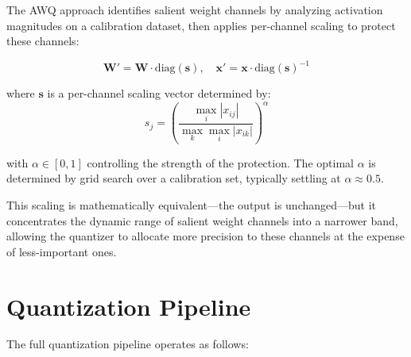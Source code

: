 \documentclass[12pt, letterpaper, twoside]{report}
\begin{document}
The AWQ approach identifies salient weight channels by analyzing activation magnitudes on a calibration dataset, then applies per-channel scaling to protect these channels:

\begin{equation}
\mathbf{W}' = \mathbf{W} \cdot \text{diag}(\mathbf{s}), \quad \mathbf{x}' = \mathbf{x} \cdot \text{diag}(\mathbf{s})^{-1}
\label{eq:awq_scaling}
\end{equation}

where $\mathbf{s}$ is a per-channel scaling vector determined by:
\begin{equation}
s_j = \left(\frac{\max_i |x_{ij}|}{\max_k \max_i |x_{ik}|}\right)^\alpha
\label{eq:awq_scale}
\end{equation}

with $\alpha \in [0, 1]$ controlling the strength of the protection. The optimal $\alpha$ is determined by grid search over a calibration set, typically settling at $\alpha \approx 0.5$.

This scaling is mathematically equivalent---the output is unchanged---but it concentrates the dynamic range of salient weight channels into a narrower band, allowing the quantizer to allocate more precision to these channels at the expense of less-important ones.

\section{Quantization Pipeline}
\label{sec:quant_pipeline}

The full quantization pipeline operates as follows:
\end{document}
